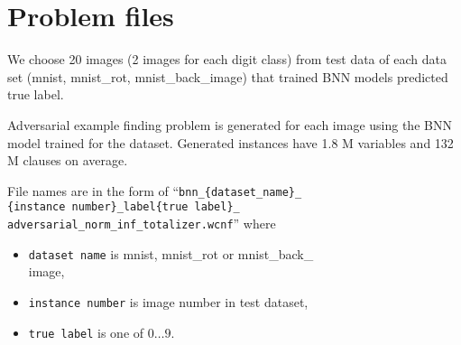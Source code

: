 \documentclass[conference]{IEEEtran}
\begin{document}
\section{Problem files}

We choose 20 images (2 images for each digit class) from test data of each data set (mnist, mnist\_rot, mnist\_back\_image) that trained BNN models predicted true label.

Adversarial example finding problem is generated for each image using the BNN model trained for the dataset.
Generated instances have 1.8 M variables and 132 M clauses on average.

File names are in the form of ``\texttt{bnn\_\{dataset\_name\}\_\\
\{instance number\}\_label\{true label\}\_\\
adversarial\_norm\_inf\_totalizer.wcnf}'' where

\begin{itemize}
    \item \texttt{dataset name} is mnist, mnist\_rot or mnist\_back\_\\image,
    \item \texttt{instance number} is image number in test dataset,
    \item \texttt{true label} is one of $0 \ldots 9$.
\end{itemize}



\end{document}
